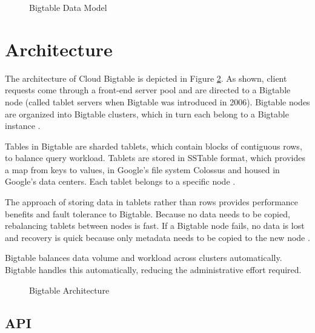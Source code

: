 \documentclass[9pt,twocolumn,twoside]{../../styles/osajnl}
\begin{document}
\begin{figure}[htbp]
\centering
{}
\caption{Bigtable Data Model \cite{www-bigtabledocoverview}}
\label{fig:bigtable-datamodel}
\end{figure}

\section{Architecture}

The architecture of Cloud Bigtable is depicted in Figure \ref{fig:bigtable-architecture}.  As shown, client requests come through a front-end server pool and are directed to a Bigtable node (called tablet servers when Bigtable was introduced in 2006). Bigtable nodes are organized into Bigtable clusters, which in turn each belong to a Bigtable instance \cite{www-bigtabledocoverview}.

Tables in Bigtable are sharded tablets, which contain blocks of contiguous rows, to balance query workload. Tablets are stored in SSTable format, which provides a map from keys to values, in Google's file system Colossus and housed in Google's data centers. Each tablet belongs to a specific node \cite{www-bigtabledocoverview}.

The approach of storing data in tablets rather than rows provides performance benefits and fault tolerance to Bigtable. Because no data needs to be copied, rebalancing tablets between nodes is fast. If a Bigtable node fails, no data is lost and recovery is quick because only metadata needs to be copied to the new node  \cite{www-bigtabledocoverview}.

Bigtable balances data volume and workload across clusters automatically. Bigtable handles this automatically, reducing the administrative effort required\cite{www-bigtabledocoverview}.



\begin{figure}[htbp]
\centering
{}
\caption{Bigtable Architecture \cite{www-bigtabledocoverview}}
\label{fig:bigtable-architecture}
\end{figure}

\subsection{API}
\end{document}
